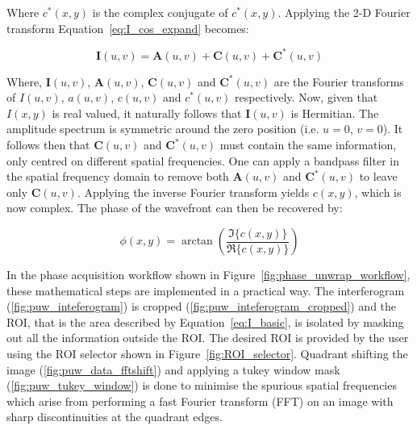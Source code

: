 Where $c^{*}(x,y)$ is the complex conjugate of $c^{*}(x,y)$. Applying the 2-D Fourier transform Equation~\ref{eq:I_cos_expand} becomes:

\begin{equation}\label{eq:I_fourier}
\boldsymbol{I}(u,v) = \boldsymbol{A}(u,v) + \boldsymbol{C}(u,v) + \boldsymbol{C}^{*}(u,v)
\end{equation}

Where, $\boldsymbol{I}(u,v)$, $\boldsymbol{A}(u,v)$, $\boldsymbol{C}(u,v)$ and  $\boldsymbol{C}^{*}(u,v)$ are the Fourier transforms of $I(u,v)$, $a(u,v)$, $c(u,v)$ and $c^{*}(u,v)$ respectively. Now, given that $I(x,y)$ is real valued, it naturally follows that $\boldsymbol{I}(u,v)$ is Hermitian. The amplitude spectrum is symmetric around the zero position (i.e. $u = 0$, $v = 0$). It follows then that $\boldsymbol{C}(u,v)$ and $\boldsymbol{C}^{*}(u,v)$ must contain the same information, only centred on different spatial frequencies. One can apply a bandpass filter in the spatial frequency domain to remove both $\boldsymbol{A}(u,v)$ and $\boldsymbol{C}^{*}(u,v)$ to leave only $\boldsymbol{C}(u,v)$.\cite{lewis1993absolute} Applying the inverse Fourier transform yields $c(x,y)$, which is now complex. The phase of the wavefront can then be recovered by:

\begin{equation}\label{eq:phase}
\phi(x,y) = \arctan\left(\frac{\Im\{c(x,y)\}}{\Re\{c(x,y)\}}\right)
\end{equation}

In the phase acquisition workflow shown in Figure~\ref{fig:phase_unwrap_workflow}, these mathematical steps are implemented in a practical way. The interferogram (\ref{fig:puw_inteferogram}) is cropped (\ref{fig:puw_inteferogram_cropped}) and the ROI, that is the area described by Equation~\ref{eq:I_basic}, is isolated by masking out all the information outside the ROI. The desired ROI is provided by the user using the ROI selector shown in Figure~\ref{fig:ROI_selector}. Quadrant shifting the image (\ref{fig:puw_data_fftshift}) and applying a tukey window mask (\ref{fig:puw_tukey_window}) is done to minimise the spurious spatial frequencies which arise from performing a fast Fourier transform (FFT) on an image with sharp discontinuities at the quadrant edges.


